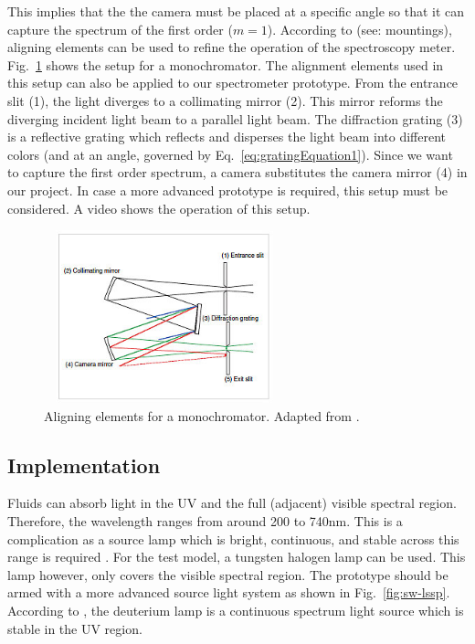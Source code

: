 \documentclass[aps,twocolumn,twoside,secnumarabic,balancelastpage,amsmath,amssymb,nofootinbib,hyperref=pdftex]{revtex4}
\begin{document}
This implies that the the camera must be placed at a specific angle so that it can capture the spectrum of the first order ($m=1$). According to \cite{mchr} (see: mountings), aligning elements can be used to refine the operation of the spectroscopy meter. Fig.~\ref{fig:sp_m} shows the setup for a monochromator. The alignment elements used in this setup can also be applied to our spectrometer prototype. From the entrance slit (1), the light diverges to a collimating mirror (2). This mirror reforms the diverging incident light beam to a parallel light beam. The diffraction grating (3) is a reflective grating which reflects and disperses the light beam into different colors (and at an angle, governed by Eq.~\ref{eq:gratingEquation1}). Since we want to capture the first order spectrum, a camera substitutes the camera mirror (4) in our project. In case a more advanced prototype is required, this setup must be considered. A video \cite{spwo} shows the operation of this setup.

\begin{figure}[htb]
\includegraphics[width=7cm, height=5cm]{mountings.jpg}
\caption{Aligning elements for a monochromator. Adapted from \cite{mchr}.
\label{fig:sp_m}}
\end{figure}


\subsection{Implementation}
Fluids can absorb light in the UV and the full (adjacent) visible spectral region. Therefore, the wavelength ranges from around 200 to 740nm. This is a complication as a source lamp which is bright, continuous, and stable across this range is required \cite{lssp}. For the test model, a tungsten halogen lamp can be used. This lamp however, only covers the visible spectral region. The prototype should be armed with a more advanced source light system as shown in Fig.~\ref{fig:sw-lssp}. According to \cite{lssp}, the deuterium lamp is a continuous spectrum light source which is stable in the UV region.  
\end{document}
